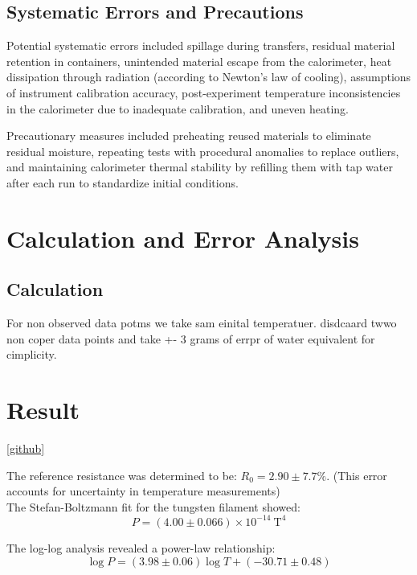 \documentclass[%
 sor,
 jor,
 amsmath,amssymb,
 reprint,%
]{revtex4-2}
\begin{document}
\subsection{Systematic Errors and Precautions}  
Potential systematic errors included spillage during transfers, residual material retention in containers, unintended material escape from the calorimeter, heat dissipation through radiation (according to Newton's law of cooling), assumptions of instrument calibration accuracy, post-experiment temperature inconsistencies in the calorimeter due to inadequate calibration, and uneven heating.  

Precautionary measures included preheating reused materials to eliminate residual moisture, repeating tests with procedural anomalies to replace outliers, and maintaining calorimeter thermal stability by refilling them with tap water after each run to standardize initial conditions.


\section{Calculation and Error Analysis}



\subsection{Calculation}
For non observed data potms we take sam einital temperatuer. disdcaard twwo non coper data points and take +- 3 grams of errpr of water equivalent for cimplicity. 

\section{Result}
\ref{github}

The reference resistance was determined to be: $R_0 = 2.90 \pm 7.7\% $. (This error accounts for uncertainty in temperature measurements)\\

The Stefan-Boltzmann fit for the tungsten filament showed:
$$
P = (4.00 \pm 0.066) \times 10^{-14}\ \mathrm{T^4}
$$

The log-log analysis revealed a power-law relationship:
$$
\log P = (3.98 \pm 0.06)\log T + (-30.71 \pm 0.48)
$$

\noindent{}\\
\\
\end{document}
